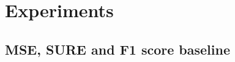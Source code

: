 

\section{Experiments}
\label{sec:experiments}









\subsection{MSE, SURE and F1 score baseline}

